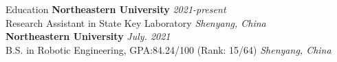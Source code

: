 \begin{rSection}{Education}
{\bf Northeastern University} \hfill {\em 2021-present} \\
{Research Assistant in State Key Laboratory} \hfill {\em Shenyang, China}\\

{\bf Northeastern University} \hfill {\em July. 2021} \\
{B.S. in Robotic Engineering}, {GPA:84.24/100 (Rank: 15/64)} \hfill {\em Shenyang, China}\\

\end{rSection}

